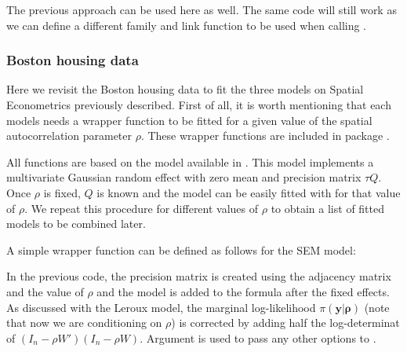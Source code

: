 \documentclass[article]{jss}
\begin{document}
The previous approach can be used here as well. The same code will still work
as we can define a different family and link function to be used when calling
.

\subsubsection{Boston housing data}

Here we revisit the Boston housing data to fit the three models on Spatial
Econometrics previously described. First of all, it is worth mentioning that
each models needs a wrapper function to be fitted for a given value of the
spatial autocorrelation parameter $\rho$. These wrapper functions are included
in  package .

All functions are based on the  model available in  .
This model implements a multivariate Gaussian random effect with zero mean
and precision matrix $\tau Q$. Once $\rho$ is fixed, $Q$ is
known and the model can be easily fitted with  for that value of
$\rho$. We repeat this procedure for different values of $\rho$ to
obtain a list of fitted models to be combined later.

A simple wrapper function can be defined as follows for the SEM model:

\begin{Schunk}
\end{Schunk}

In the previous code, the precision matrix  is created using the
adjacency matrix and the value of $\rho$ and the  model is added
to the formula after the fixed effects. As discussed with the Leroux model, the
marginal log-likelihood $\pi(\mathbf{y|\rho})$  (note that now we are
conditioning on $\rho$) is corrected by adding half the log-determinat of
$(I_n-\rho W')(I_n-\rho W)$.  Argument  is used to pass any other
options to .
\end{document}
